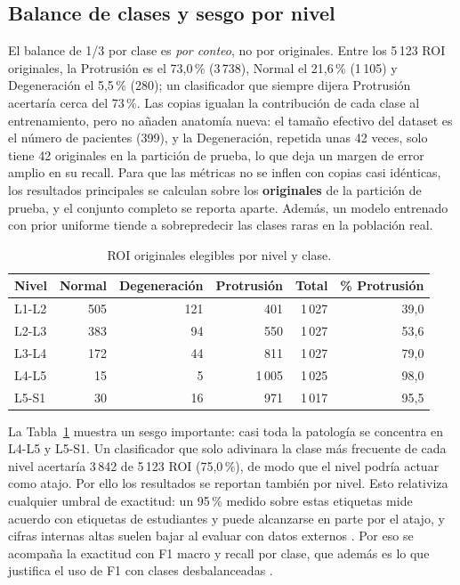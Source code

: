 \subsection{Balance de clases y sesgo por nivel}
\label{sec:balance}
El balance de 1/3 por clase es \emph{por conteo}, no por originales. Entre los 5\,123 ROI originales, la Protrusión es el 73,0\,\% (3\,738), Normal el 21,6\,\% (1\,105) y Degeneración el 5,5\,\% (280); un clasificador que siempre dijera Protrusión acertaría cerca del 73\,\%. Las copias igualan la contribución de cada clase al entrenamiento, pero no añaden anatomía nueva: el tamaño efectivo del dataset es el número de pacientes (399), y la Degeneración, repetida unas 42 veces, solo tiene 42 originales en la partición de prueba, lo que deja un margen de error amplio en su recall. Para que las métricas no se inflen con copias casi idénticas, los resultados principales se calculan sobre los \textbf{originales} de la partición de prueba, y el conjunto completo se reporta aparte. Además, un modelo entrenado con prior uniforme tiende a sobrepredecir las clases raras en la población real.

\begin{table}[t]
\centering\small
\caption{ROI originales elegibles por nivel y clase.}
\label{tab:nivel}
\begin{tabular}{lrrrrr}
\toprule
Nivel & Normal & Degeneración & Protrusión & Total & \% Protrusión \\
\midrule
L1-L2 & 505 & 121 & 401    & 1\,027 & 39,0 \\
L2-L3 & 383 & 94  & 550    & 1\,027 & 53,6 \\
L3-L4 & 172 & 44  & 811    & 1\,027 & 79,0 \\
L4-L5 & 15  & 5   & 1\,005 & 1\,025 & 98,0 \\
L5-S1 & 30  & 16  & 971    & 1\,017 & 95,5 \\
\bottomrule
\end{tabular}
\end{table}

La Tabla~\ref{tab:nivel} muestra un sesgo importante: casi toda la patología se concentra en L4-L5 y L5-S1. Un clasificador que solo adivinara la clase más frecuente de cada nivel acertaría 3\,842 de 5\,123 ROI (75,0\,\%), de modo que el nivel podría actuar como atajo. Por ello los resultados se reportan también por nivel. Esto relativiza cualquier umbral de exactitud: un 95\,\% medido sobre estas etiquetas mide acuerdo con etiquetas de estudiantes y puede alcanzarse en parte por el atajo, y cifras internas altas suelen bajar al evaluar con datos externos \cite{yi2023}. Por eso se acompaña la exactitud con F1 macro y recall por clase, que además es lo que justifica el uso de F1 con clases desbalanceadas \cite{alkubaisi2022}.


